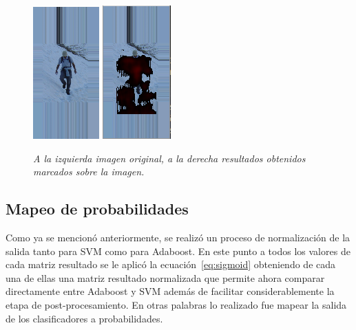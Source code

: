 \begin{figure}[H]
  \centering
  \includegraphics[scale=1]{images/imgorig}
  \includegraphics[scale=1]{images/resultadosobreimagen}
  \caption{\em A la izquierda imagen original, a la derecha resultados obtenidos marcados sobre la imagen.}  
  \label{fig:resultadoenimagen}
\end{figure}


\subsection{Mapeo de probabilidades}

Como ya se mencionó anteriormente, se realizó un proceso de normalización de la salida tanto para SVM como para Adaboost. En este punto a todos los valores de cada matriz resultado se le aplicó la ecuación~\ref{eq:sigmoid} obteniendo de cada una de ellas una matriz resultado normalizada que permite ahora comparar directamente entre Adaboost y SVM además de facilitar considerablemente la etapa de post-procesamiento. En otras palabras lo realizado fue mapear la salida de los clasificadores a probabilidades.

